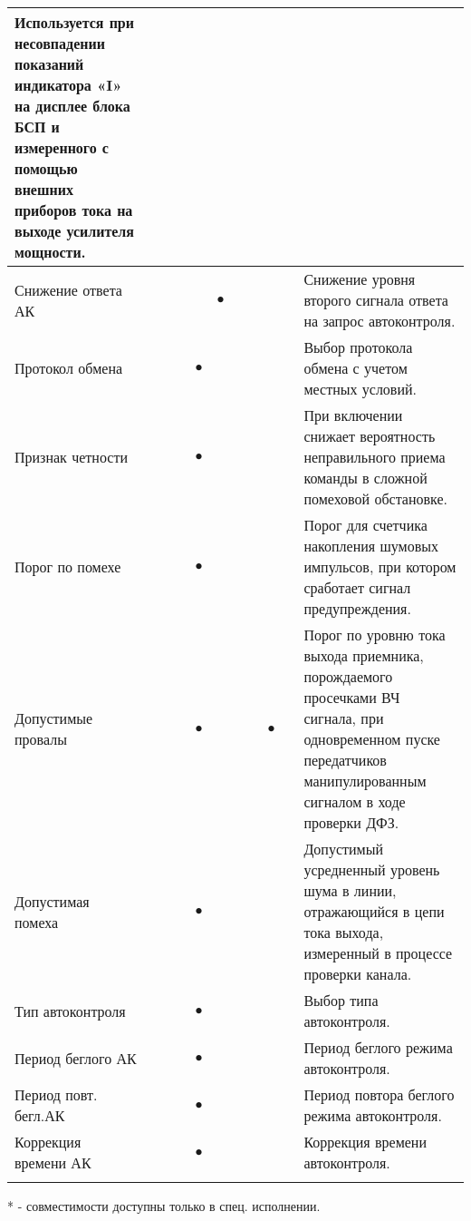 \begin{tabularx}{\linewidth}{| M{4.6cm} |*{9}{p{0.3cm} |} m{5.8cm} |}
	Используется при несовпадении показаний индикатора «I» на дисплее блока БСП и измеренного с помощью внешних приборов тока на выходе усилителя мощности.  \tabularnewline \hline
	Снижение ответа АК	&   		&   		&   		&   		& $\bullet$ &   		&   		&   		&   		& 
	Снижение уровня второго сигнала ответа на запрос автоконтроля. \tabularnewline \hline
	Протокол обмена		&   		&   		&   		& $\bullet$ &   		&   		&   		&   		&   		& 
	Выбор протокола обмена с учетом местных условий. \tabularnewline \hline
	Признак четности	&   		&   		&  			& $\bullet$ &   		&   		&   		&   		&   		& 
	При включении снижает вероятность неправильного приема команды в сложной помеховой обстановке. \tabularnewline \hline
	Порог по помехе		&   		&   		&   		& $\bullet$ &   		&   		&   		&   		&   		& 
	Порог для счетчика накопления шумовых импульсов, при котором сработает сигнал предупреждения. \tabularnewline \hline
	Допустимые провалы	&   		&   		&   		& $\bullet$ &   		&   		&   		& $\bullet$ &   		& 
	Порог по уровню тока выхода приемника, порождаемого просечками ВЧ сигнала, при одновременном пуске передатчиков манипулированным сигналом в ходе проверки ДФЗ. \tabularnewline \hline
	Допустимая помеха	&   		&   		&   		& $\bullet$ &   		&   		&   		&   		&   		& 
	Допустимый усредненный уровень шума в линии, отражающийся в цепи тока выхода, измеренный в процессе проверки канала. \tabularnewline \hline
	Тип автоконтроля	&   		&   		&   		& $\bullet$ &   		&   		&   		&   		&   		& 
	Выбор типа автоконтроля. \tabularnewline \hline
	Период беглого АК	&   		&   		&   		& $\bullet$ &   		&   		&   		&   		&   		& 
	Период беглого режима автоконтроля. \tabularnewline \hline
	Период повт. бегл.АК &   		&   		&   		& $\bullet$ &   		&   		&   		&   		&   		& 
	Период повтора беглого режима автоконтроля. \tabularnewline \hline
	Коррекция времени АК &   		&   		&   		& $\bullet$ &   		&   		&   		&   		&   		& 
	Коррекция времени автоконтроля. \tabularnewline 
	
    \lasthline
\end{tabularx} 

* - совместимости доступны только в спец. исполнении.
